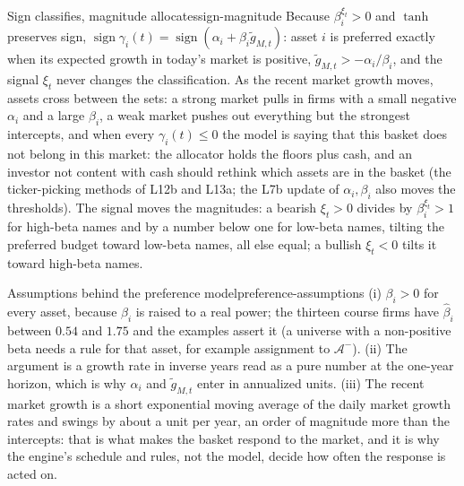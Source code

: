 \documentclass[11pt]{article}
\newcommand{\Am}{\mathcal A^{-}}
\begin{document}
\begin{proposition}{Sign classifies, magnitude allocates}{sign-magnitude}
Because $\beta_i^{\xi_t}>0$ and $\tanh$ preserves sign, $\operatorname{sign}\gamma_i(t)=\operatorname{sign}(\alpha_i+\beta_i\tilde g_{M,t})$: asset $i$ is preferred exactly when its expected growth in today's market is positive, $\tilde g_{M,t}>-\alpha_i/\beta_i$, and the signal $\xi_t$ never changes the classification. As the recent market growth moves, assets cross between the sets: a strong market pulls in firms with a small negative $\alpha_i$ and a large $\beta_i$, a weak market pushes out everything but the strongest intercepts, and when every $\gamma_i(t)\le0$ the model is saying that this basket does not belong in this market: the allocator holds the floors plus cash, and an investor not content with cash should rethink which assets are in the basket (the ticker-picking methods of L12b and L13a; the L7b update of $\alpha_i,\beta_i$ also moves the thresholds). The signal moves the magnitudes: a bearish $\xi_t>0$ divides by $\beta_i^{\xi_t}>1$ for high-beta names and by a number below one for low-beta names, tilting the preferred budget toward low-beta names, all else equal; a bullish $\xi_t<0$ tilts it toward high-beta names.
\end{proposition}

\begin{remark}{Assumptions behind the preference model}{preference-assumptions}
(i) $\beta_i>0$ for every asset, because $\beta_i$ is raised to a real power; the thirteen course firms have $\hat\beta_i$ between $0.54$ and $1.75$ and the examples assert it (a universe with a non-positive beta needs a rule for that asset, for example assignment to $\Am$). (ii) The argument is a growth rate in inverse years read as a pure number at the one-year horizon, which is why $\alpha_i$ and $\tilde g_{M,t}$ enter in annualized units. (iii) The recent market growth is a short exponential moving average of the daily market growth rates and swings by about a unit per year, an order of magnitude more than the intercepts: that is what makes the basket respond to the market, and it is why the engine's schedule and rules, not the model, decide how often the response is acted on.
\end{remark}
\end{document}
